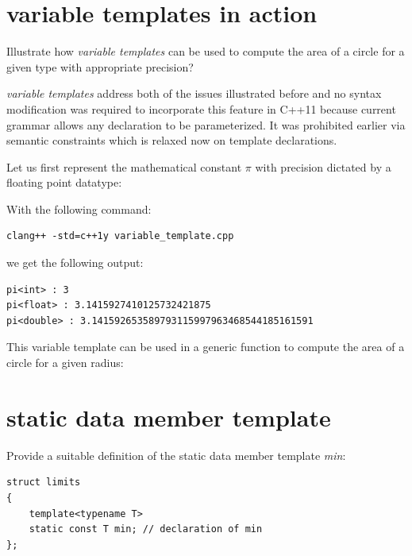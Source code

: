 \section{variable templates in action}

\begin{Exercise}[title={variable templates in action}, difficulty=2, label=ex04]
Illustrate how \emph{variable templates} can be used to compute the area of a circle for a given type with appropriate precision?
\end{Exercise}


\begin{Answer}[ref=ex04]
\emph{variable templates} address both of the issues illustrated before and no syntax modification was required to incorporate this feature in C++11 because current grammar allows any declaration to be parameterized. It was prohibited earlier via semantic constraints which is relaxed now on template declarations.

Let us first represent the mathematical constant $\pi$ with precision dictated by a floating point datatype:

With the following command:
\begin{verbatim}
clang++ -std=c++1y variable_template.cpp 
\end{verbatim}

we get the following output:
\begin{verbatim}
pi<int> : 3
pi<float> : 3.1415927410125732421875
pi<double> : 3.141592653589793115997963468544185161591
\end{verbatim}

This variable template can be used in a generic function to compute the area of a circle for a given radius:


\end{Answer}




\section{static data member template}

\begin{Exercise}[title={static data member template}, difficulty=2, label=ex05]
Provide a suitable definition of the static data member template \emph{min}:
\begin{lstlisting}
struct limits 
{
    template<typename T>
    static const T min; // declaration of min
};
\end{lstlisting}
\end{Exercise}


